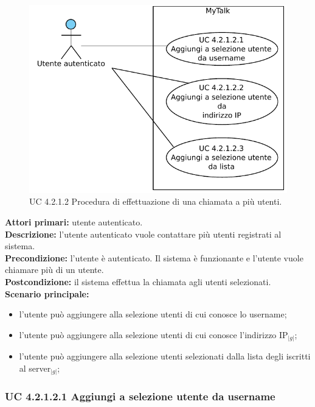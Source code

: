 \begin{figure}[htbp]
\centering
\includegraphics[scale=0.7]{./casi_uso/UC4-2-1-2.pdf}
\caption{UC 4.2.1.2 Procedura di effettuazione di una chiamata a più utenti.}
\end{figure}

\noindent
\textbf{Attori primari:} utente autenticato.\\
\textbf{Descrizione:} l'utente autenticato vuole contattare più utenti registrati al sistema.\\
\textbf{Precondizione:} l'utente è autenticato. Il sistema è funzionante e l'utente vuole chiamare più di un utente.\\
\textbf{Postcondizione:} il sistema effettua la chiamata agli utenti selezionati.\\
\textbf{Scenario principale:}
\begin{itemize}
\item l'utente può aggiungere alla selezione utenti di cui conosce lo username;
\item l'utente può aggiungere alla selezione utenti di cui conosce l'indirizzo IP$_{|g|}$;
\item l'utente può aggiungere alla selezione utenti selezionati dalla lista degli iscritti al server$_{|g|}$;
\end{itemize}

\newpage

\subsubsection{UC 4.2.1.2.1 Aggiungi a selezione utente da username}

